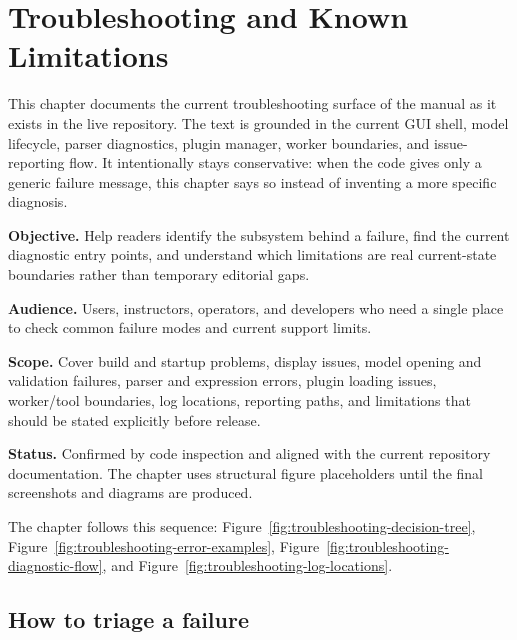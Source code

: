 \chapter{Troubleshooting and Known Limitations}
\label{chap:troubleshooting-and-known-limitations}

This chapter documents the current troubleshooting surface of the manual as it
exists in the live repository. The text is grounded in the current GUI shell,
model lifecycle, parser diagnostics, plugin manager, worker boundaries, and
issue-reporting flow. It intentionally stays conservative: when the code gives
only a generic failure message, this chapter says so instead of inventing a
more specific diagnosis.

\noindent\textbf{Objective.} Help readers identify the subsystem behind a
failure, find the current diagnostic entry points, and understand which
limitations are real current-state boundaries rather than temporary editorial
gaps.

\noindent\textbf{Audience.} Users, instructors, operators, and developers who
need a single place to check common failure modes and current support limits.

\noindent\textbf{Scope.} Cover build and startup problems, display issues,
model opening and validation failures, parser and expression errors, plugin
loading issues, worker/tool boundaries, log locations, reporting paths, and
limitations that should be stated explicitly before release.

\noindent\textbf{Status.} Confirmed by code inspection and aligned with the
current repository documentation. The chapter uses structural figure
placeholders until the final screenshots and diagrams are produced.

The chapter follows this sequence:
Figure~\ref{fig:troubleshooting-decision-tree},
Figure~\ref{fig:troubleshooting-error-examples},
Figure~\ref{fig:troubleshooting-diagnostic-flow}, and
Figure~\ref{fig:troubleshooting-log-locations}.

\section{How to triage a failure}
\label{sec:troubleshooting-triage}

